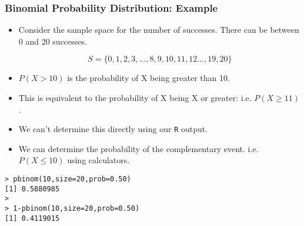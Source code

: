 \documentclass[a4]{beamer}
\begin{document}
\begin{frame}[fragile]
\frametitle{Binomial Probability Distribution: Example}

\begin{itemize}
\item Consider the sample space for the number of successes. There can be between 0 and 20 successes.

\[ S = \{0,1,2,3,\ldots,8,9,10,11,12 \ldots,19,20\}
\]

\item  $P(X > 10)$ is the probability of X being greater than 10.
\item This is equivalent to the probability of X being X or greater: i.e. $P(X \geq 11)$.
\item We can't determine this directly using our \texttt{R} output.

\item We can determine the probability of the complementary event. i.e. $P(X \leq 10)$ using calculators.
\end{itemize}
\begin{verbatim}
> pbinom(10,size=20,prob=0.50)
[1] 0.5880985
>
> 1-pbinom(10,size=20,prob=0.50)
[1] 0.4119015
\end{verbatim}
\end{frame}

\end{document}

